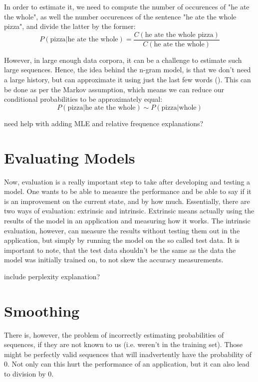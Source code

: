 In order to estimate it, we need to compute the number of occurences of "he ate the whole", as well the number occurences of the sentence "he ate the whole pizza", and divide the latter by the former:
\begin{equation}
    P(\text{pizza}|\text{he ate the whole})=\frac{C(\text{he ate the whole pizza})}{C(\text{he ate the whole})}
\end{equation}

However, in large enough data corpora, it can be a challenge to estimate such large sequences. Hence, the idea behind the n-gram model, is that we don't need a large history, but can approximate it using just the last few words (\cite{Jura09a}). This can be done as per the Markov assumption, which means we can reduce our conditional probabilities to be approximately equal:
\begin{equation}
    P(\text{pizza}|\text{he ate the whole}) \sim P(\text{pizza}|\text{whole})
\end{equation}

need help with adding MLE and relative frequence explanations?

\section{Evaluating Models}
Now, evaluation is a really important step to take after developing and testing a model. One wants to be able to measure the performance and be able to say if it is an improvement on the current state, and by how much. Essentially, there are two ways of evaluation: extrinsic and intrinsic. Extrinsic means actually using the results of the model in an application and measuring how it works. The intrinsic evaluation, however, can measure the results without testing them out in the application, but simply by running the model on the so called test data. It is important to note, that the test data shouldn't be the same as the data the model was initially trained on, to not skew the accuracy measurements.

include perplexity explanation?

\section{Smoothing}
There is, however, the problem of incorrectly estimating probabilities of sequences, if they are not known to us (i.e. weren't in the training set). Those might be perfectly valid sequences that will inadvertently have the probability of 0. Not only can this hurt the performance of an application, but it can also lead to division by 0.

